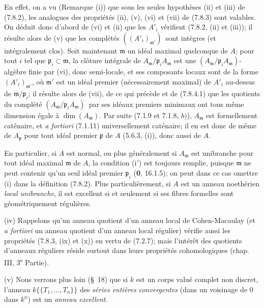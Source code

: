 \begin{remarks}[7.8.4]
En effet, on a vu (Remarque (i)) que sous les seules hypothèses (ii) et (iii)
de (7.8.2), les analogues des propriétés (ii), (v), (vi) et (vii) de
(7.8.3) sont valables. On déduit donc d'abord de (vi) et (ii) que les $A'_i$
vérifient (7.8.2, (ii) et (iii)); il résulte alors de (v) que les complétés
$((A'_i)_{\mathfrak m'})^{\widehat{\,}}$ sont intègres (et intégralement clos). Soit
maintenant $\mathfrak m$ un idéal maximal quelconque de $A$; pour tout $i$ tel
que $\mathfrak p_i\subset\mathfrak m$, la clôture intégrale de
$A_{\mathfrak m}/\mathfrak p_iA_{\mathfrak m}$ est une
$(A_{\mathfrak m}/\mathfrak p_iA_{\mathfrak m})$-algèbre finie par (vi), donc
semi-locale, et ses composants locaux sont de la forme
$(A'_i)_{\mathfrak m'}$, où $\mathfrak m'$ est un idéal premier
(nécessairement maximal) de $A'_i$ au-dessus de
$\mathfrak m/\mathfrak p_i$; il résulte alors de (vii), de ce qui précède et de
(7.8.4.1) que les quotients du complété
$(A_{\mathfrak m}/\mathfrak p_iA_{\mathfrak m})^{\widehat{\,}}$ par ses idéaux
premiers minimaux ont tous même dimension égale à $\dim(A_{\mathfrak m})$. Par
suite (7.1.9 et 7.1.8, $b)$), $A_{\mathfrak m}$ est formellement caténaire, et
\emph{a fortiori} (7.1.11) universellement caténaire; il en est donc de même de
$A_{\mathfrak p}$ pour tout idéal premier $\mathfrak p$ de $A$ (5.6.3, (i)),
donc aussi de $A$.

En particulier, si $A$ est normal, ou plus généralement si $A_{\mathfrak m}$
est unibranche pour tout idéal maximal $\mathfrak m$ de $A$, la condition
(i$'$) est toujours remplie, puisque $\mathfrak m$ ne peut contenir qu'un seul
idéal premier $\mathfrak p_i$ (\textbf{0}, 16.1.5); on peut dans ce cas omettre (i) dans
la définition (7.8.2). Plus particulièrement, si $A$ est un anneau noethérien
\emph{local unibranche}, il est excellent si et seulement si ses fibres
formelles sont géométriquement régulières.

(iv) Rappelons qu'un anneau quotient d'un anneau local de Cohen-Macaulay (et
\emph{a fortiori} un anneau quotient d'un anneau local régulier) vérifie aussi
les propriétés (7.8.3, (ix) et (x)) en vertu de (7.2.7); mais l'intérêt des
quotients d'anneaux réguliers réside surtout dans leurs propriétés
cohomologiques (chap. III, 3\textsuperscript{e} Partie).

(v) Nous verrons plus loin (\S~18) que si $k$ est un corps valué complet non
discret, l'anneau $k\{\!\{T_1,\ldots,T_n\}\!\}$ des \emph{séries entières
convergentes} (dans un voisinage de $0$ dans $k^n$) est un \emph{anneau
excellent}.
\end{remarks}

